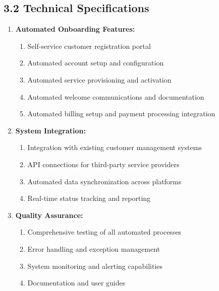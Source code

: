 \subsection*{3.2 Technical Specifications}
\begin{enumerate}[label=\arabic*.]
\item \textbf{Automated Onboarding Features:}
    \begin{enumerate}[label=(\alph*)]
    \item Self-service customer registration portal
    \item Automated account setup and configuration
    \item Automated service provisioning and activation
    \item Automated welcome communications and documentation
    \item Automated billing setup and payment processing integration
    \end{enumerate}

\item \textbf{System Integration:}
    \begin{enumerate}[label=(\alph*)]
    \item Integration with existing customer management systems
    \item API connections for third-party service providers
    \item Automated data synchronization across platforms
    \item Real-time status tracking and reporting
    \end{enumerate}

\item \textbf{Quality Assurance:}
    \begin{enumerate}[label=(\alph*)]
    \item Comprehensive testing of all automated processes
    \item Error handling and exception management
    \item System monitoring and alerting capabilities
    \item Documentation and user guides
    \end{enumerate}
\end{enumerate}

